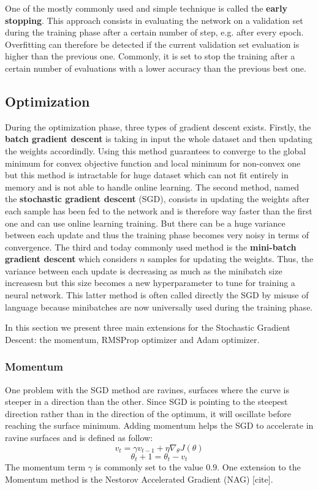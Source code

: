 \documentclass[master,final,11pt]{iscs-thesis}
\begin{document}
One of the mostly commonly used and simple technique is called the \textbf{early stopping}. This approach consists in evaluating the network on a validation set during the training phase after a certain number of step, e.g. after every epoch. Overfitting can therefore be detected if the current validation set evaluation is higher than the previous one. Commonly, it is set to stop the training after a certain number of evaluations with a lower accuracy than the previous best one. 

\subsection{Optimization}

During the optimization phase, three types of gradient descent exists. Firstly, the \textbf{batch gradient descent} is taking in input the whole dataset and then updating the weights accordindly. Using this method guarantees to converge to the global minimum for convex objective function and local minimum for non-convex one but this method is intractable for huge dataset which can not fit entirely in memory and is not able to handle online learning. The second method, named the \textbf{stochastic gradient descent} (SGD), consists in updating the weights after each sample has been fed to the network and is therefore way faster than the first one and can use online learning training. But there can be a huge variance between each update and thus the training phase becomes very noisy in terms of convergence. The third and today commonly used method is the \textbf{mini-batch gradient descent} which considers $n$ samples for updating the weights. Thus, the variance between each update is decreasing as much as the minibatch size increasesn but this size becomes a new hyperparameter to tune for training a neural network. This latter method is often called directly the SGD by misuse of language because minibatches are now universally used during the training phase.

In this section we present three main extensions for the Stochastic Gradient Descent: the momentum, RMSProp optimizer and Adam optimizer.
\subsubsection{Momentum}

One problem with the SGD method are ravines, surfaces where the curve is steeper in a direction than the other. Since SGD is pointing to the steepest direction rather than in the direction of the optimum, it will oscillate before reaching the surface minimum. Adding momentum helps the SGD to accelerate in ravine surfaces and is defined as follow:
\[v_t = \gamma v_{t-1} + \eta \nabla_\theta J(\theta)\]
\[\theta_t+1 = \theta_t - v_t\]
The momentum term $\gamma$ is commonly set to the value $0.9$. One extension to the Momentum method is the Nestorov Accelerated Gradient (NAG) [cite].
\end{document}
